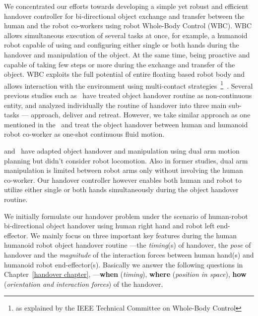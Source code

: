 We concentrated our efforts towards developing a simple yet robust and efficient handover controller for bi-directional object exchange and transfer between the human and the robot co-workers using robot Whole-Body Control (WBC). WBC allows simultaneous execution of several tasks at once, for example, a humanoid robot capable of using and configuring either single or both hands during the handover and manipulation of the object. At the same time, being proactive and capable of taking few steps or more during the exchange and transfer of the object. WBC exploits the full potential of entire floating based robot body and allows interaction with the environment using multi-contact strategies~\footnote{as explained by the IEEE Technical Committee on Whole-Body Control}~\cite{ladder-HRP-2Kai}. Several previous studies such as~\cite{strabala2013toward, huber2008human} have treated object handover routine as non-continuous entity, and analyzed individually the routine of handover into three main sub-tasks — approach, deliver and retreat. However, we take similar approach as one mentioned in the~\cite{medina2016human, nemlekarprompt} and treat the object handover between human and humanoid robot co-worker as one-shot continuous fluid motion.

\cite{vahrenkamp2009humanoid, vezzani2017novel} and~\cite{kim2004advanced} have adapted object handover and manipulation using dual arm motion planning but didn't consider robot locomotion. Also in former studies, dual arm manipulation is limited between robot arms only without involving the human co-worker. Our handover controller however enables both human and robot to utilize either single or both hands simultaneously during the object handover routine.

We initially formulate our handover problem under the scenario of human-robot bi-directional object handover using human right hand and robot left end-effector. We mainly focus on three important key features during the human humanoid robot object handover routine ---the \textit{timing}(s) of handover, the \textit{pose} of handover and the \textit{magnitude} of the interaction forces between human hand(s) and humanoid robot end-effector(s). Basically we answer the following questions in Chapter~\ref{handover chapter}, ---\textbf{when} (\textit{timing}), \textbf{where} (\textit{position in space}), \textbf{how} (\textit{orientation and interaction forces}) of the handover.

